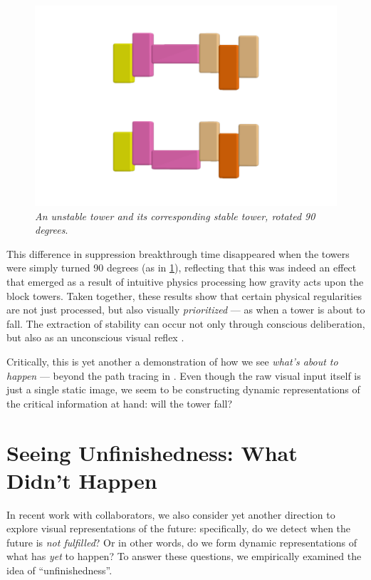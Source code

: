 \begin{figure}
    \centering
    \includegraphics[width=\textwidth]{figures/DiscussFigs/stableunstable-pink2.png}
    \caption
    {\textit{An unstable tower and its corresponding stable tower, rotated 90 degrees}.}
    \label{fig:DiscussFig_1sideways}
\end{figure}

This difference in suppression breakthrough time disappeared when the towers were simply turned 90 degrees (as in \cref{fig:DiscussFig_1sideways}), reflecting that this was indeed an effect that emerged as a result of intuitive physics processing how gravity acts upon the block towers. Taken together, these results show that certain physical regularities are not just processed, but also visually \textit{prioritized} --- as when a tower is about to fall. The extraction of stability can occur not only through conscious deliberation, but also as an unconscious visual reflex \parencite{wong_unconscious_2024}.

Critically, this is yet another a demonstration of how we see \textit{what’s about to happen} --- beyond the path tracing in .  Even though the raw visual input itself is just a single static image, we seem to be constructing dynamic representations of the critical information at hand: will the tower fall?  

\section{Seeing Unfinishedness: What Didn’t Happen}
In recent work with collaborators, we also consider yet another direction to explore visual representations of the future: specifically, do we detect when the future is \textit{not fulfilled}?  Or in other words, do we form dynamic representations of what has \textit{yet} to happen?  To answer these questions, we empirically examined the idea of “unfinishedness”.  

